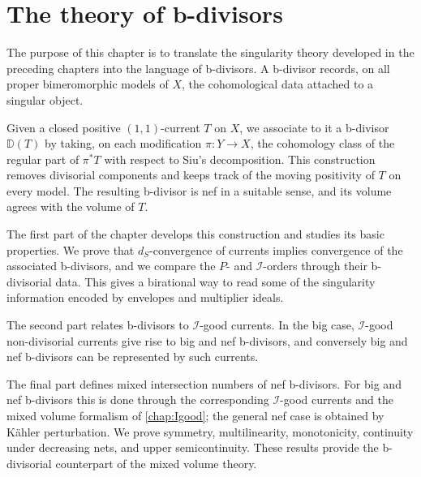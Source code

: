 \chapter{The theory of b-divisors}
\label{chap:bdiv}

The purpose of this chapter is to translate the singularity theory developed in the preceding chapters into the language of b-divisors. A b-divisor records, on all proper bimeromorphic models of $X$, the cohomological data attached to a singular object.

Given a closed positive $(1,1)$-current $T$ on $X$, we associate to it a b-divisor $\mathbb D(T)$ by taking, on each modification $\pi\colon Y\to X$, the cohomology class of the regular part of $\pi^*T$ with respect to Siu's decomposition. This construction removes divisorial components and keeps track of the moving positivity of $T$ on every model. The resulting b-divisor is nef in a suitable sense, and its volume agrees with the volume of $T$.

The first part of the chapter develops this construction and studies its basic properties. We prove that $d_S$-convergence of currents implies convergence of the associated b-divisors, and we compare the $P$- and $\mathcal I$-orders through their b-divisorial data. This gives a birational way to read some of the singularity information encoded by envelopes and multiplier ideals.

The second part relates b-divisors to $\mathcal I$-good currents. In the big case, $\mathcal I$-good non-divisorial currents give rise to big and nef b-divisors, and conversely big and nef b-divisors can be represented by such currents.

The final part defines mixed intersection numbers of nef b-divisors. For big and nef b-divisors this is done through the corresponding $\mathcal I$-good currents and the mixed volume formalism of \cref{chap:Igood}; the general nef case is obtained by K\"ahler perturbation. We prove symmetry, multilinearity, monotonicity, continuity under decreasing nets, and upper semicontinuity. These results provide the b-divisorial counterpart of the mixed volume theory.


